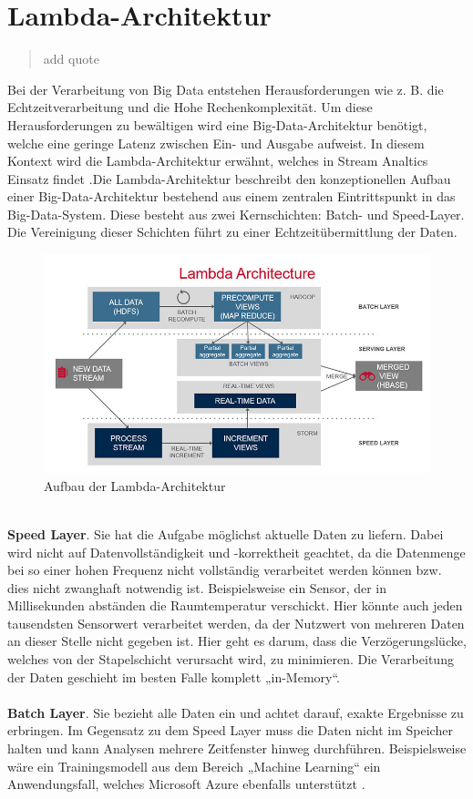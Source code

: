 \section{Lambda-Architektur}

\begin{quote}\glqq add quote \grqq~\cite[S.14]{Roth.2016}\end{quote} 
Bei der Verarbeitung von Big Data entstehen Herausforderungen wie z. B. die Echtzeitverarbeitung und die Hohe Rechenkomplexität. Um diese Herausforderungen zu bewältigen wird eine Big-Data-Architektur benötigt, welche eine geringe Latenz zwischen Ein- und Ausgabe aufweist. In diesem Kontext wird die Lambda-Architektur erwähnt, welches in Stream Analtics Einsatz findet \cite{Familiar.2017}.Die  Lambda-Architektur  beschreibt den  konzeptionellen  Aufbau  einer  Big-Data-Architektur bestehend  aus  einem  zentralen  Eintrittspunkt  in  das  Big-Data-System. Diese besteht aus zwei Kernschichten: Batch- und Speed-Layer. Die Vereinigung dieser Schichten führt zu einer Echtzeitübermittlung der Daten. 
\begin{figure}[h!]
	\centering
	\includegraphics[width=1.0\linewidth]{images/lambda-architecture}
	\caption{Aufbau der Lambda-Architektur} %
	\label{fig:cnn_structure}
\end{figure}
\\ \textbf{Speed Layer}. Sie hat die Aufgabe möglichst aktuelle Daten zu liefern. Dabei wird nicht auf Datenvollständigkeit und -korrektheit geachtet, da die Datenmenge bei so einer hohen Frequenz nicht vollständig verarbeitet werden können bzw. dies nicht zwanghaft notwendig ist. Beispielsweise ein Sensor, der in Millisekunden abständen die Raumtemperatur verschickt. Hier könnte auch jeden tausendsten Sensorwert verarbeitet werden, da der Nutzwert von mehreren Daten an dieser Stelle nicht gegeben ist. Hier geht es darum, dass die Verzögerungslücke, welches von der Stapelschicht verursacht wird, zu minimieren. Die Verarbeitung der Daten geschieht im besten Falle komplett „in-Memory“.\\ \\ \textbf{Batch Layer}. Sie bezieht alle Daten ein und achtet darauf, exakte Ergebnisse zu erbringen. Im Gegensatz zu dem Speed Layer muss die Daten nicht im Speicher halten und kann Analysen mehrere Zeitfenster hinweg durchführen. Beispielsweise wäre ein Trainingsmodell aus dem Bereich „Machine Learning“ ein Anwendungsfall, welches Microsoft Azure ebenfalls unterstützt \cite{Berle.2017}. 

